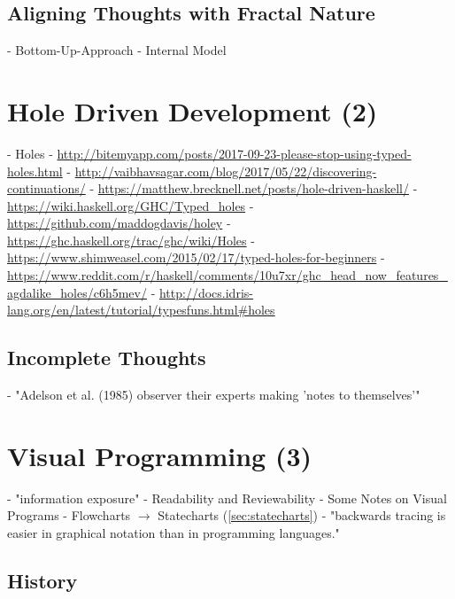 \subsection{Aligning Thoughts with Fractal Nature}
- Bottom-Up-Approach \autocite[19--25]{horrocks_constructing_1999}
- Internal Model \autocite[33]{leveson_experiences_1991}

\section{Hole Driven Development (2)}
- Holes \autocite[20--21]{brady_type-driven_2017}
- \url{http://bitemyapp.com/posts/2017-09-23-please-stop-using-typed-holes.html}
- \url{http://vaibhavsagar.com/blog/2017/05/22/discovering-continuations/}
- \url{https://matthew.brecknell.net/posts/hole-driven-haskell/}
- \url{https://wiki.haskell.org/GHC/Typed_holes}
- \url{https://github.com/maddogdavis/holey}
- \url{https://ghc.haskell.org/trac/ghc/wiki/Holes}
- \url{https://www.shimweasel.com/2015/02/17/typed-holes-for-beginners}
- \url{https://www.reddit.com/r/haskell/comments/10u7xr/ghc_head_now_features_agdalike_holes/c6h5mev/}
- \url{http://docs.idris-lang.org/en/latest/tutorial/typesfuns.html#holes}
\subsection{Incomplete Thoughts}
- "Adelson et al. (1985) observer their experts making 'notes to themselves'" \autocite[241]{visser_expert_1990}

\section{Visual Programming (3)}
- "information exposure" \autocite[34]{leveson_experiences_1991}
- Readability and Reviewability \autocite[37-38]{leveson_experiences_1991}
- Some Notes on Visual Programs \autocite[5--6]{green_pictures_1982}
- Flowcharts $\rightarrow$ Statecharts (\ref{sec:statecharts}) \autocite[8]{green_pictures_1982}
- "backwards tracing is easier in graphical notation than in programming languages." \autocite[20]{green_pictures_1982}
\subsection{History}

